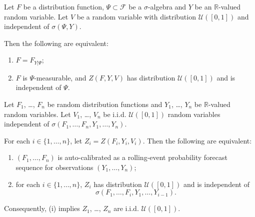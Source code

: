 \documentclass[10pt,a4paper]{amsart}
\begin{document}
\begin{proposition}\label{auto-calibration_PIT}
  Let $F$ be a distribution function, $\Psi \subset \mathcal{F}$ be a $\sigma$-algebra and $Y$ be an $\mathbb{R}$-valued random variable. Let $V$ be a random variable with distribution $\mathcal{U}([0,1])$ and independent of $\sigma(\Psi, Y)$.

  Then the following are equivalent:
\begin{enumerate}[label=(\roman*)]
  \item $F = F_{Y|\Psi}$;
  \item $F$ is $\Psi$-measurable, and $Z(F,Y,V)$ has distribution $\mathcal{U}([0,1])$ and is independent of $\Psi$.
\end{enumerate}
\end{proposition}

\begin{proposition}\label{PIT_values}
  Let $F_1$, \ldots, $F_n$ be random distribution functions and $Y_1$, \ldots, $Y_n$ be $\mathbb{R}$-valued random variables. Let $V_1$, \ldots, $V_n$ be i.i.d. $\mathcal{U}([0,1])$ random variables independent of $\sigma(F_1, \ldots, F_n, Y_1, \ldots, Y_n)$.

  For each $i \in \{1, \ldots, n\}$, let $Z_i = Z(F_i, Y_i, V_i)$. Then the following are equivalent:
\begin{enumerate}[label=(\roman*)]
  \item $(F_1, \ldots, F_n)$ is auto-calibrated as a rolling-event probability forecast sequence for observations $(Y_1, \ldots, Y_n)$;
  \item for each $i \in \{1, \ldots, n\}$, $Z_i$ has distribution $\mathcal{U}([0,1])$ and is independent of 
\begin{equation*}
  \sigma(F_1, \ldots, F_i, Y_1, \ldots, Y_{i-1}).
\end{equation*}
\end{enumerate}

  Consequently, {\normalfont (i)} implies $Z_1$, \ldots, $Z_n$ are i.i.d. $\mathcal{U}([0,1])$.
\end{proposition}
\end{document}
